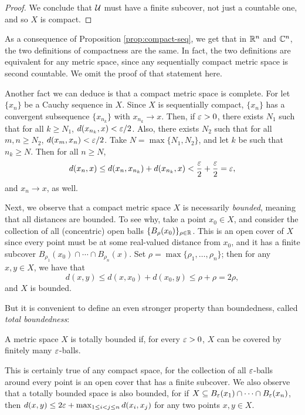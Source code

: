 \begin{proof}
	We conclude that $\mathcal{U}$ must have a finite subcover, not just a countable one, and so $X$ is compact.
\end{proof}

As a consequence of Proposition \ref{prop:compact-seq}, we get that in $\mathbb R^n$ and $\mathbb C^n$, the two definitions of compactness are the same. In fact, the two definitions are equivalent for any metric space, since any sequentially compact metric space is second countable. We omit the proof of that statement here.

Another fact we can deduce is that a compact metric space is complete. For let $\{x_n\}$ be a Cauchy sequence in $X$. Since $X$ is sequentially compact, $\{x_n\}$ has a convergent subsequence $\{x_{n_k}\}$ with $x_{n_k} \rightarrow x$. Then, if $\varepsilon>0$, there exists $N_1$ such that for all $k \ge N_1$, $d(x_{n_k},x)<\varepsilon/2$. Also, there exists $N_2$ such that for all $m,n \ge N_2$, $d(x_m,x_n)<\varepsilon/2$. Take $N=\max\{N_1,N_2\}$, and let $k$ be such that $n_k \ge N$. Then for all $n \ge N$, $$d(x_n,x) \le d(x_n,x_{n_k})+d(x_{n_k},x)<\dfrac{\varepsilon}{2}+\dfrac{\varepsilon}{2}=\varepsilon,$$ and $x_n \rightarrow x$, as well.

Next, we observe that a compact metric space $X$ is necessarily \emph{bounded}, meaning that all distances are bounded. To see why, take a point $x_0 \in X$, and consider the collection of all (concentric) open balls $\{B_{\rho}(x_0)\}_{\rho \in \mathbb R}$. This is an open cover of $X$ since every point must be at some real-valued distance from $x_0$, and it has a finite subcover $B_{\rho_1}(x_0) \cap \cdots \cap B_{\rho_n}(x)$. Set $\rho=\max\{\rho_1,\dots,\rho_n\}$; then for any $x,y \in X$, we have that $$d(x,y) \le d(x,x_0)+d(x_0,y) \le \rho+\rho=2\rho,$$ and $X$ is bounded.

But it is convenient to define an even stronger property than boundedness, called \emph{total boundedness}:
\begin{definition}
	A metric space $X$ is totally bounded if, for every $\varepsilon>0$, $X$ can be covered by finitely many $\varepsilon$-balls.
\end{definition}

This is certainly true of any compact space, for the collection of all $\varepsilon$-balls around every point is an open cover that has a finite subcover. We also observe that a totally bounded space is also bounded, for if $X \subseteq B_{\varepsilon}(x_1) \cap \cdots \cap B_{\varepsilon}(x_n)$, then $d(x,y) \le 2\varepsilon+\max_{1 \le i<j \le n} d(x_i,x_j)$ for any two points $x,y \in X$.

